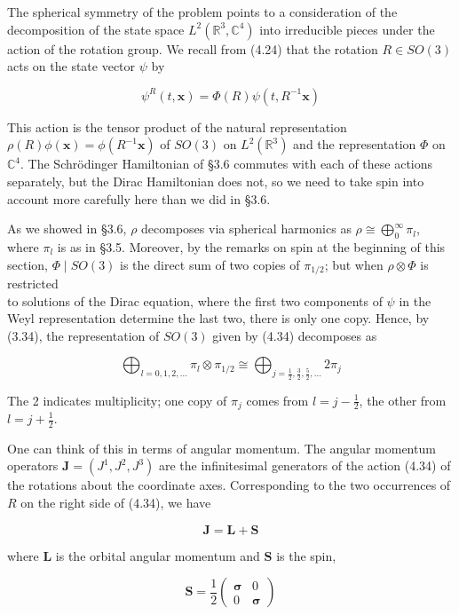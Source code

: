 \documentclass[10pt, letterpaper]{article}
\begin{document}
The spherical symmetry of the problem points to a consideration of the decomposition of the state space $L^{2}\left(\mathbb{R}^{3}, \mathbb{C}^{4}\right)$ into irreducible pieces under the action of the rotation group. We recall from (4.24) that the rotation $R \in S O(3)$ acts on the state vector $\psi$ by

$$
\psi^{R}(t, \mathbf{x})=\Phi(R) \psi\left(t, R^{-1} \mathbf{x}\right)
$$

This action is the tensor product of the natural representation $\rho(R) \phi(\mathbf{x})=\phi\left(R^{-1} \mathbf{x}\right)$ of $S O(3)$ on $L^{2}\left(\mathbb{R}^{3}\right)$ and the representation $\Phi$ on $\mathbb{C}^{4}$. The Schrödinger Hamiltonian of §3.6 commutes with each of these actions separately, but the Dirac Hamiltonian does not, so we need to take spin into account more carefully here than we did in §3.6.

As we showed in §3.6, $\rho$ decomposes via spherical harmonics as $\rho \cong \bigoplus_{0}^{\infty} \pi_{l}$, where $\pi_{l}$ is as in §3.5. Moreover, by the remarks on spin at the beginning of this section, $\Phi \mid S O(3)$ is the direct sum of two copies of $\pi_{1 / 2}$; but when $\rho \otimes \Phi$ is restricted\\
to solutions of the Dirac equation, where the first two components of $\psi$ in the Weyl representation determine the last two, there is only one copy. Hence, by (3.34), the representation of $S O(3)$ given by (4.34) decomposes as

$$
\bigoplus_{l=0,1,2, \ldots} \pi_{l} \otimes \pi_{1 / 2} \cong \bigoplus_{j=\frac{1}{2}, \frac{3}{2}, \frac{5}{2}, \ldots} 2 \pi_{j}
$$

The 2 indicates multiplicity; one copy of $\pi_{j}$ comes from $l=j-\frac{1}{2}$, the other from $l=j+\frac{1}{2}$.

One can think of this in terms of angular momentum. The angular momentum operators $\mathbf{J}=\left(J^{1}, J^{2}, J^{3}\right)$ are the infinitesimal generators of the action (4.34) of the rotations about the coordinate axes. Corresponding to the two occurrences of $R$ on the right side of (4.34), we have

$$
\mathbf{J}=\mathbf{L}+\mathbf{S}
$$

where $\mathbf{L}$ is the orbital angular momentum and $\mathbf{S}$ is the spin,

$$
\mathbf{S}=\frac{1}{2}\left(\begin{array}{ll}
\boldsymbol{\sigma} & 0 \\
0 & \boldsymbol{\sigma}
\end{array}\right)
$$
\end{document}

